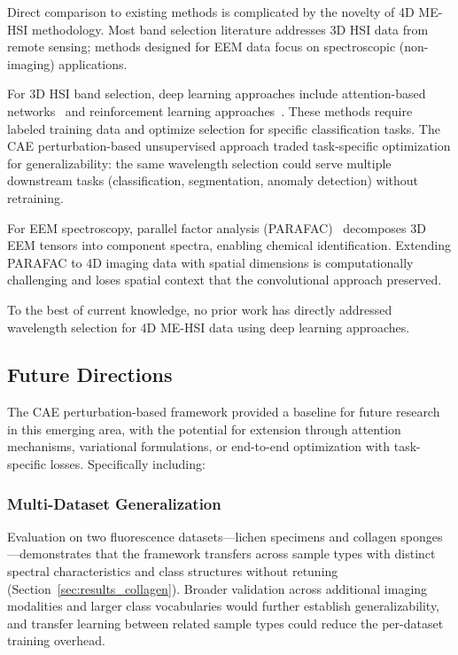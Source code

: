 Direct comparison to existing methods is complicated by the novelty of 4D ME-HSI methodology.
Most band selection literature addresses 3D HSI data from remote sensing; methods designed for EEM data focus on spectroscopic (non-imaging) applications.

For 3D HSI band selection, deep learning approaches include attention-based networks~\cite{mou2017deep} and reinforcement learning approaches~\cite{roy2020hybridsn}.
These methods require labeled training data and optimize selection for specific classification tasks.
The CAE perturbation-based unsupervised approach traded task-specific optimization for generalizability: the same wavelength selection could serve multiple downstream tasks (classification, segmentation, anomaly detection) without retraining.

For EEM spectroscopy, parallel factor analysis (PARAFAC)~\cite{bro1997parafac} decomposes 3D EEM tensors into component spectra, enabling chemical identification.
Extending PARAFAC to 4D imaging data with spatial dimensions is computationally challenging and loses spatial context that the convolutional approach preserved.

To the best of current knowledge, no prior work has directly addressed wavelength selection for 4D ME-HSI data using deep learning approaches.


\subsection{Future Directions}
\label{sec:future_work}

The CAE perturbation-based framework provided a baseline for future research in this emerging area, with the potential for extension through attention mechanisms, variational formulations, or end-to-end optimization with task-specific losses. Specifically including: 
\subsubsection{Multi-Dataset Generalization}
Evaluation on two fluorescence datasets---lichen specimens and collagen
sponges---demonstrates that the framework transfers across sample types with
distinct spectral characteristics and class structures without retuning
(Section~\ref{sec:results_collagen}). Broader validation across additional
imaging modalities and larger class vocabularies would further establish
generalizability, and transfer learning between related sample types could
reduce the per-dataset training overhead.

